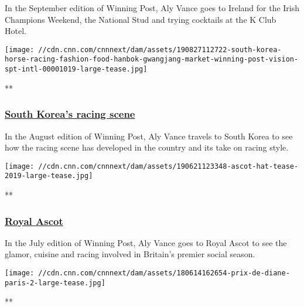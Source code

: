 In the September edition of Winning Post, Aly Vance goes to Ireland for
the Irish Champions Weekend, the National Stud and trying cocktails at
the K Club Hotel.

\href{/videos/sports/2019/10/30/south-korea-horse-racing-seoul-fashion-kpop-winning-post-spt-intl.cnn}{}

\texttt{[image: //cdn.cnn.com/cnnnext/dam/assets/190827112722-south-korea-horse-racing-fashion-food-hanbok-gwangjang-market-winning-post-vision-spt-intl-00001019-large-tease.jpg]}

**

\hypertarget{south-koreas-racing-scene}{%
\subsubsection{\texorpdfstring{\href{/videos/sports/2019/10/30/south-korea-horse-racing-seoul-fashion-kpop-winning-post-spt-intl.cnn}{South
Korea's racing
scene}}{South Korea's racing scene}}\label{south-koreas-racing-scene}}

In the August edition of Winning Post, Aly Vance travels to South Korea
to see how the racing scene has developed in the country and its take on
racing style.

\href{/videos/sports/2019/10/30/royal-ascot-fashion-cuisine-social-season-horse-racing-winning-post-vision-spt-intl-gbr.cnn}{}

\texttt{[image: //cdn.cnn.com/cnnnext/dam/assets/190621123348-ascot-hat-tease-2019-large-tease.jpg]}

**

\hypertarget{royal-ascot}{%
\subsubsection{\texorpdfstring{\href{/videos/sports/2019/10/30/royal-ascot-fashion-cuisine-social-season-horse-racing-winning-post-vision-spt-intl-gbr.cnn}{Royal
Ascot}}{Royal Ascot}}\label{royal-ascot}}

In the July edition of Winning Post, Aly Vance goes to Royal Ascot to
see the glamor, cuisine and racing involved in Britain's premier social
season.

\href{/videos/sports/2019/10/30/prix-de-diane-chantilly-racecourse-elegance-winning-post-food-vision-spt-intl.cnn}{}

\texttt{[image: //cdn.cnn.com/cnnnext/dam/assets/180614162654-prix-de-diane-paris-2-large-tease.jpg]}

**

